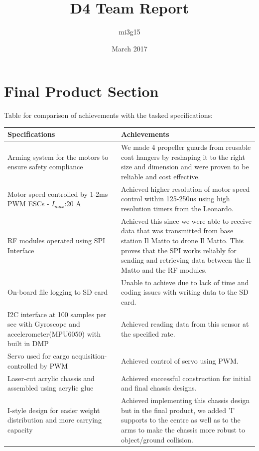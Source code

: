 \documentclass{article}
\title{D4 Team Report}
\author{mi3g15 }
\date{March 2017}
\begin{document}
\maketitle

\section{Final Product Section}
Table for comparison of achievements with the tasked specifications:
\begin{center}
  \begin{table}
    \begin{tabular}{|m{5cm}|m{8cm}|}
    \hline
     Specifications & Achievements \\
     \hline
     Arming system for the motors to ensure safety compliance &  We made 4 propeller guards from reusable coat hangers by reshaping it to the right size and dimension and were proven to be reliable and cost effective.\\
    \hline
    Motor speed controlled by 1-2ms PWM ESCs - $I_{max}$:20 A & Achieved higher resolution of motor speed control within 125-250us using high resolution timers from the Leonardo.\\
    \hline
    RF modules operated using SPI Interface & %
    Achieved this since we were able to receive data that was transmitted from base station Il Matto to drone Il Matto. This proves that the SPI works reliably for sending and retrieving data between the Il Matto and the RF modules.\\
    \hline
    On-board file logging to SD card & Unable to achieve due to lack of time and coding issues with writing data to the SD card. \\
    \hline
    I2C interface at 100 samples per sec with Gyroscope and accelerometer(MPU6050) with built in DMP & Achieved reading data from this sensor at the specified rate.  \\
    \hline
    Servo used for cargo acquisition- controlled by PWM & Achieved control of servo using PWM. \\
    \hline
    Laser-cut acrylic chassis and assembled using acrylic glue & Achieved successful construction for initial and final chassis designs. \\
    \hline 
    I-style design for easier weight distribution and more carrying capacity & Achieved implementing this chassis design but in the final product, we added 'I' supports to the centre as well as to the arms to make the chassis more robust to object/ground collision. \\

\end{tabular}
\end{table}
\end{center}
\end{document}

